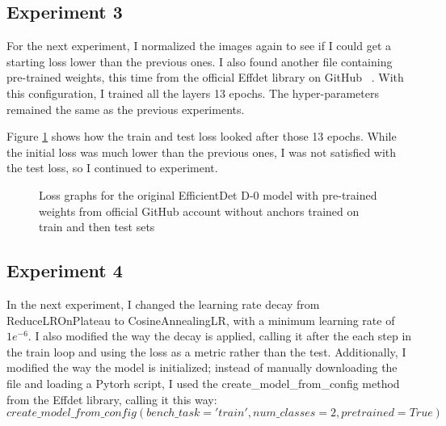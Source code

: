 \subsection{Experiment 3}

For the next experiment, I normalized the images again to see if I could get a starting loss lower than the previous ones. I also found another file containing pre-trained weights, this time from the official Effdet library on GitHub ~\cite{link7}. With this configuration, I trained all the layers 13 epochs. The hyper-parameters remained the same as the previous experiments. 

Figure \ref{fig:fig27} shows how the train and test loss looked after those 13 epochs. While the initial loss was much lower than the previous ones, I was not satisfied with the test loss, so I continued to experiment.

\begin{figure}[!ht]
    \label{fig:fig27}
    \caption{Loss graphs for the original EfficientDet D-0 model with pre-trained weights from official GitHub account without anchors trained on train and then test sets}
\end{figure}

\subsection{Experiment 4}

In the next experiment, I changed the learning rate decay from ReduceLROnPlateau to CosineAnnealingLR, with a minimum learning rate of \(1e^{-6}\). I also modified the way the decay is applied, calling it after the each step in the train loop and using the loss as a metric rather than the test. Additionally, I modified the way the model is initialized; instead of manually downloading the file and loading a Pytorh script, I used the create\_model\_from\_config method from the Effdet library, calling it this way: \[
create\_model\_from\_config(bench\_task='train', num\_classes=2, pretrained=True)\]

